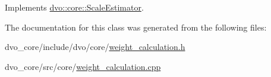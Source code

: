 Implements \mbox{\hyperlink{classdvo_1_1core_1_1_scale_estimator_a6968ac2cd37c2ce1c966f0c9e17d1a3c}{dvo\+::core\+::\+Scale\+Estimator}}.



The documentation for this class was generated from the following files\+:\begin{DoxyCompactItemize}
\item 
dvo\+\_\+core/include/dvo/core/\mbox{\hyperlink{weight__calculation_8h}{weight\+\_\+calculation.\+h}}\item 
dvo\+\_\+core/src/core/\mbox{\hyperlink{weight__calculation_8cpp}{weight\+\_\+calculation.\+cpp}}\end{DoxyCompactItemize}
